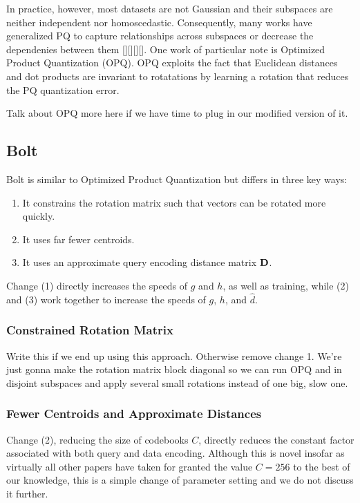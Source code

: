 In practice, however, most datasets are not Gaussian and their subspaces are neither independent nor homoscedastic. Consequently, many works have generalized PQ to capture relationships across subspaces or decrease the dependenies between them [][][][]. One work of particular note is Optimized Product Quantization (OPQ). OPQ exploits the fact that Euclidean distances and dot products are invariant to rotatations by learning a rotation that reduces the PQ quantization error.

Talk about OPQ more here if we have time to plug in our modified version of it.

\subsection{Bolt}

Bolt is similar to Optimized Product Quantization but differs in three key ways:
\begin{enumerate}
\item It constrains the rotation matrix such that vectors can be rotated more quickly.
\item It uses far fewer centroids.
\item It uses an approximate query encoding distance matrix $\mathbf{D}$.
\end{enumerate}

Change (1) directly increases the speeds of $g$ and $h$, as well as training, while (2) and (3) work together to increase the speeds of $g$, $h$, and $\hat{d}$.

\subsubsection{Constrained Rotation Matrix}

Write this if we end up using this approach. Otherwise remove change 1. We're just gonna make the rotation matrix block diagonal so we can run OPQ and in disjoint subspaces and apply several small rotations instead of one big, slow one.

\subsubsection{Fewer Centroids and Approximate Distances}

Change (2), reducing the size of codebooks $C$, directly reduces the constant factor associated with both query and data encoding. Although this is novel insofar as virtually all other papers have taken for granted the value $C = 256$ to the best of our knowledge, this is a simple change of parameter setting and we do not discuss it further.

